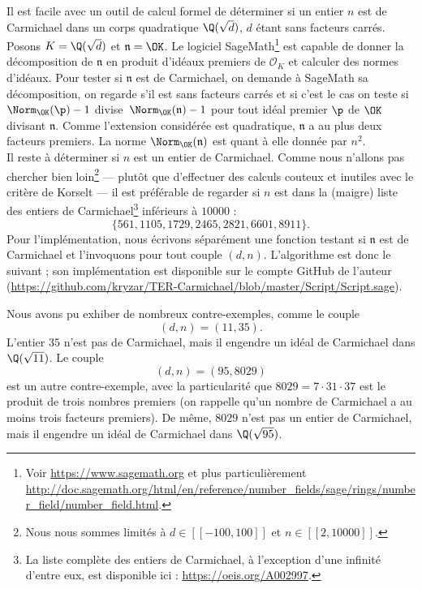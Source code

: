\documentclass[a4paper, 12pt, oneside]{article}
\begin{document}
Il est facile avec un outil de calcul formel de déterminer si un entier $n$ est de Carmichael dans un corps quadratique $\Q(\sqrt{d})$, $d$ étant sans facteurs carrés. Posons $K=\Q(\sqrt{d})$ et $\mathfrak{n} = \OK$. Le logiciel SageMath\footnote{Voir \url{https://www.sagemath.org} et plus particulièrement \url{http://doc.sagemath.org/html/en/reference/number_fields/sage/rings/number_field/number_field.html}.} est capable de donner la décomposition de $\mathfrak{n}$ en produit d'idéaux premiers de $\mathcal{O}_K$ et calculer des normes d'idéaux. Pour tester si $\mathfrak{n}$ est de Carmichael, on demande à SageMath sa décomposition, on regarde s'il est sans facteurs carrés et si c'est le cas on teste si $\Norm_\OK(\p) - 1$ divise $\Norm_\OK(\mathfrak{n}) - 1$ pour tout idéal premier $\p$ de $\OK$ divisant $\mathfrak{n}$. Comme l'extension considérée est quadratique, $\mathfrak{n}$ a au plus deux facteurs premiers. La norme $\Norm_\OK(\mathfrak{n})$ est quant à elle donnée par $n^2$. \\

Il reste à déterminer si $n$ est un entier de Carmichael. Comme nous n'allons pas chercher bien loin\footnote{Nous nous sommes limités à $d\in [\![-100, 100]\!]$ et $n\in [\![2, 10000]\!]$.} — plutôt que d'effectuer des calculs couteux et inutiles avec le critère de Korselt — il est préférable de regarder si $n$ est dans la (maigre) liste des entiers de Carmichael\footnote{La liste complète des entiers de Carmichael, à l'exception d'une infinité d'entre eux, est disponible ici : \url{https://oeis.org/A002997}.} inférieurs à $10000$ : $$\{561, 1105, 1729, 2465, 2821, 6601, 8911\}.$$ Pour l'implémentation, nous écrivons séparément une fonction testant si $\mathfrak{n}$ est de Carmichael et l'invoquons pour tout couple $(d, n)$. L'algorithme est donc le suivant ; son implémentation est disponible sur le compte GitHub de l'auteur (\url{https://github.com/kryzar/TER-Carmichael/blob/master/Script/Script.sage}).

\vspace{1em}
\begin{algorithm}[H]
\end{algorithm}
\vspace{1em}

Nous avons pu exhiber de nombreux contre-exemples, comme le couple $$(d, n) = (11, 35).$$ L'entier $35$ n'est pas de Carmichael, mais il engendre un idéal de Carmichael dans $\Q(\sqrt{11})$. Le couple $$(d, n) = (95,8029)$$ est un autre contre-exemple, avec la particularité que $8029 = 7\cdot 31\cdot 37$ est le produit de trois nombres premiers (on rappelle qu'un nombre de Carmichael a au moins trois facteurs premiers). De même, $8029$ n'est pas un entier de Carmichael, mais il engendre un idéal de Carmichael dans $\Q(\sqrt{95})$.

\nocite{*}
\printbibliography
\end{document}
